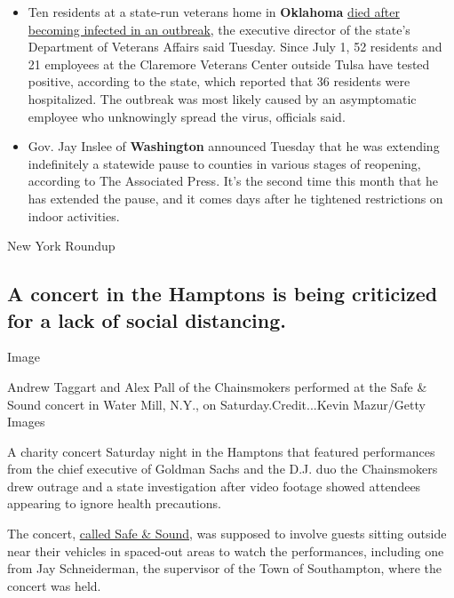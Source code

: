 \begin{itemize}
\item
  Ten residents at a state-run veterans home in \textbf{Oklahoma}
  \href{https://www.facebookcorewwwi.onion/watch/live/?v=2612399062314091\&ref=watch_permalink}{died
  after becoming infected in an outbreak}, the executive director of the
  state's Department of Veterans Affairs said Tuesday. Since July 1, 52
  residents and 21 employees at the Claremore Veterans Center outside
  Tulsa have tested positive, according to the state, which reported
  that 36 residents were hospitalized. The outbreak was most likely
  caused by an asymptomatic employee who unknowingly spread the virus,
  officials said.
\item
  Gov. Jay Inslee of \textbf{Washington} announced Tuesday that he was
  extending indefinitely a statewide pause to counties in various stages
  of reopening, according to The Associated Press. It's the second time
  this month that he has extended the pause, and it comes days after he
  tightened restrictions on indoor activities.
\end{itemize}

New York Roundup

\hypertarget{a-concert-in-the-hamptons-is-being-criticized-for-a-lack-of-social-distancing}{%
\subsection{A concert in the Hamptons is being criticized for a lack of
social
distancing.}\label{a-concert-in-the-hamptons-is-being-criticized-for-a-lack-of-social-distancing}}

Image

Andrew Taggart and Alex Pall of the Chainsmokers performed at the Safe
\& Sound concert in Water Mill, N.Y., on Saturday.Credit...Kevin
Mazur/Getty Images

A charity concert Saturday night in the Hamptons that featured
performances from the chief executive of Goldman Sachs and the D.J. duo
the Chainsmokers drew outrage and a state investigation after video
footage showed attendees appearing to ignore health precautions.

The concert,
\href{https://www.tixr.com/groups/intheknow/events/jaja-presents-safe-sound-hamptons-chainsmokers-18912}{called
Safe \& Sound}, was supposed to involve guests sitting outside near
their vehicles in spaced-out areas to watch the performances, including
one from Jay Schneiderman, the supervisor of the Town of Southampton,
where the concert was held.

